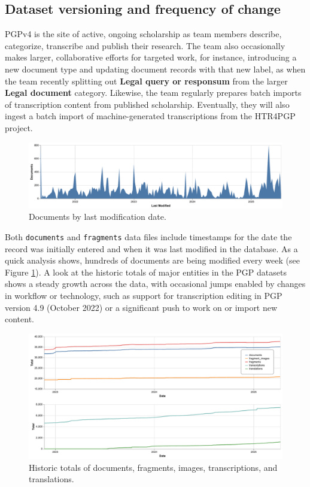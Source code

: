 \documentclass{article}
\begin{document}
\subsection{Dataset versioning and frequency of change}

PGPv4 is the site of active, ongoing scholarship as team members describe, categorize, transcribe and publish  their research. The team also occasionally makes larger, collaborative efforts for targeted work, for instance, introducing a new document type and updating document records with that new label, as when the team recently splitting out \textbf{Legal query or responsum} from the larger \textbf{Legal document} category. Likewise, the team regularly prepares batch imports of transcription content from published scholarship. Eventually, they will also ingest a batch import of machine-generated transcriptions from the HTR4PGP project.

\begin{figure}[!hbt]
  \includegraphics[width=\textwidth]{charts/docs_last_modified.pdf}
  \centering
  \caption{Documents by last modification date.}
  \label{fig:docs-last-modified}
\end{figure}

Both \texttt{documents} and \texttt{fragments} data files include timestamps for the date the record was initially entered and when it was last modified in the database. As a quick analysis shows, hundreds of documents are being modified every week (see Figure \ref{fig:docs-last-modified}). A look at the historic totals of major entities in the PGP datasets shows a steady growth across the data, with occasional jumps enabled by changes in workflow or technology, such as support for transcription editing in PGP version 4.9 (October 2022) or a significant push to work on or import new content.

\begin{figure}[!hbt]
  \includegraphics[width=\textwidth]{charts/combined_totals_historic.pdf}
  \centering
  \caption{Historic totals of documents, fragments, images, transcriptions, and translations.}
  \label{fig:historic-totals}
\end{figure}
\end{document}
